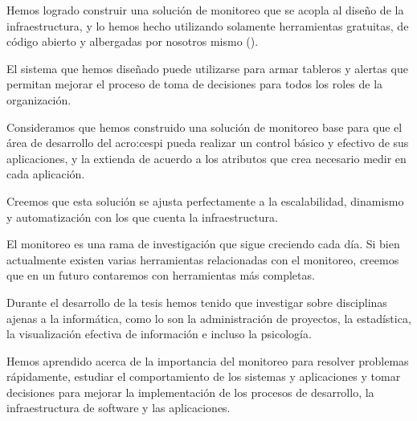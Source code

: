 Hemos logrado construir una solución de monitoreo que se acopla al diseño de la
infraestructura, y lo hemos hecho utilizando solamente herramientas gratuitas,
de código abierto y albergadas por nosotros mismo ().

El sistema que hemos diseñado puede utilizarse para armar tableros y alertas
que permitan mejorar el proceso de toma de decisiones para todos los roles de
la organización.

Consideramos que hemos construido una solución de monitoreo base para que el
área de desarrollo del \gls{acro:cespi} pueda realizar un control básico y
efectivo de sus aplicaciones, y la extienda de acuerdo a los atributos que crea
necesario medir en cada aplicación.

Creemos que esta solución se ajusta perfectamente a la escalabilidad, dinamismo
y automatización con los que cuenta la infraestructura.

El monitoreo es una rama de investigación que sigue creciendo cada día. Si bien
actualmente existen varias herramientas relacionadas con el monitoreo, creemos
que en un futuro contaremos con herramientas más completas.

Durante el desarrollo de la tesis hemos tenido que investigar sobre disciplinas
ajenas a la informática, como lo son la administración de proyectos, la
estadística, la visualización efectiva de información e incluso la psicología.

Hemos aprendido acerca de la importancia del monitoreo para resolver problemas
rápidamente, estudiar el comportamiento de los sistemas y aplicaciones y tomar
decisiones para mejorar la implementación de los procesos de desarrollo, la
infraestructura de software y las aplicaciones.
